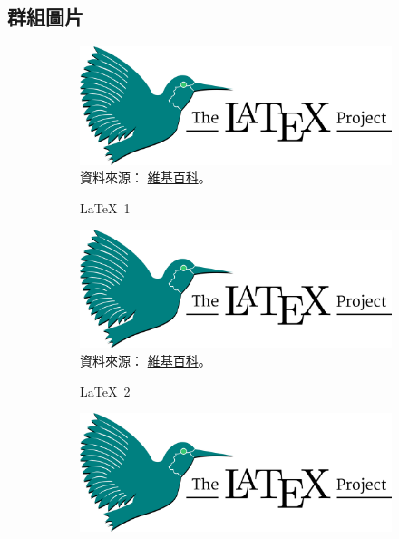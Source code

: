 \documentclass[utf8,12pt]{article} %
\begin{document}
\subsection{群組圖片}
%
%
\begin{figure}[htbp]
	\centering 
	\begin{subfigure}[b]{0.45\textwidth} %
		\centering 
		\includegraphics[width=\textwidth]{Fig/LaTeX}\\
		\footnotesize{資料來源：
		\href{https://en.wikipedia.org/wiki/LaTeX}{維基百科}。}
		\caption{\LaTeX~1} 
		\label{LaTeX 1} %
	\end{subfigure}
	\hfill
	\begin{subfigure}[b]{0.45\textwidth}
		\centering
		\includegraphics[width=\textwidth]{Fig/LaTeX}
		\footnotesize{資料來源：
		\href{https://en.wikipedia.org/wiki/LaTeX}{維基百科}。}
		\caption{\LaTeX~2} 
		\label{LaTeX 2} %
	\end{subfigure}
	\par
	\begin{subfigure}[b]{0.45\textwidth} %
		\centering 
		\includegraphics[width=\textwidth]{Fig/LaTeX}\\

\end{subfigure}
\end{figure}
\end{document}
